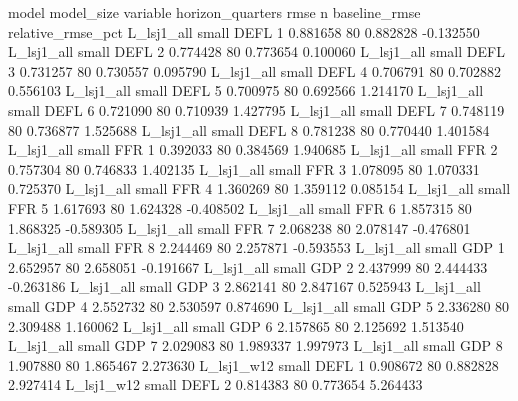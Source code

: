          model model_size variable  horizon_quarters     rmse  n  baseline_rmse  relative_rmse_pct
    L_lsj1_all      small     DEFL                 1 0.881658 80       0.882828          -0.132550
    L_lsj1_all      small     DEFL                 2 0.774428 80       0.773654           0.100060
    L_lsj1_all      small     DEFL                 3 0.731257 80       0.730557           0.095790
    L_lsj1_all      small     DEFL                 4 0.706791 80       0.702882           0.556103
    L_lsj1_all      small     DEFL                 5 0.700975 80       0.692566           1.214170
    L_lsj1_all      small     DEFL                 6 0.721090 80       0.710939           1.427795
    L_lsj1_all      small     DEFL                 7 0.748119 80       0.736877           1.525688
    L_lsj1_all      small     DEFL                 8 0.781238 80       0.770440           1.401584
    L_lsj1_all      small      FFR                 1 0.392033 80       0.384569           1.940685
    L_lsj1_all      small      FFR                 2 0.757304 80       0.746833           1.402135
    L_lsj1_all      small      FFR                 3 1.078095 80       1.070331           0.725370
    L_lsj1_all      small      FFR                 4 1.360269 80       1.359112           0.085154
    L_lsj1_all      small      FFR                 5 1.617693 80       1.624328          -0.408502
    L_lsj1_all      small      FFR                 6 1.857315 80       1.868325          -0.589305
    L_lsj1_all      small      FFR                 7 2.068238 80       2.078147          -0.476801
    L_lsj1_all      small      FFR                 8 2.244469 80       2.257871          -0.593553
    L_lsj1_all      small      GDP                 1 2.652957 80       2.658051          -0.191667
    L_lsj1_all      small      GDP                 2 2.437999 80       2.444433          -0.263186
    L_lsj1_all      small      GDP                 3 2.862141 80       2.847167           0.525943
    L_lsj1_all      small      GDP                 4 2.552732 80       2.530597           0.874690
    L_lsj1_all      small      GDP                 5 2.336280 80       2.309488           1.160062
    L_lsj1_all      small      GDP                 6 2.157865 80       2.125692           1.513540
    L_lsj1_all      small      GDP                 7 2.029083 80       1.989337           1.997973
    L_lsj1_all      small      GDP                 8 1.907880 80       1.865467           2.273630
    L_lsj1_w12      small     DEFL                 1 0.908672 80       0.882828           2.927414
    L_lsj1_w12      small     DEFL                 2 0.814383 80       0.773654           5.264433
